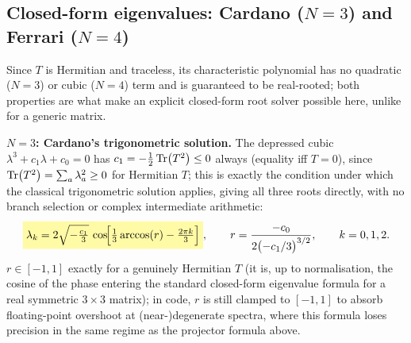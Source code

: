 \begin{theorybox}
\subsection*{Closed-form eigenvalues: Cardano ($N=3$) and Ferrari ($N=4$)}
Since $T$ is Hermitian and traceless, its characteristic polynomial has no
quadratic ($N=3$) or cubic ($N=4$) term and is guaranteed to be
real-rooted; both properties are what make an explicit closed-form root
solver possible here, unlike for a generic matrix.

\textbf{$N=3$: Cardano's trigonometric solution.} The depressed cubic
$\lambda^3+c_1\lambda+c_0=0$ has $c_1=-\tfrac12\Tr(T^2)\leq0$ always
(equality iff $T=0$), since $\Tr(T^2)=\sum_a\lambda_a^2\geq0$ for
Hermitian $T$; this is exactly the condition under which the classical
trigonometric solution applies, giving all three roots directly, with no
branch selection or complex intermediate arithmetic:
\begin{equation}
  \keyresult{\lambda_k = 2\sqrt{-\tfrac{c_1}{3}}\,
    \cos\!\Bigl[\tfrac13\arccos(r) - \tfrac{2\pi k}{3}\Bigr]},
  \qquad
  r = \frac{-c_0}{2\bigl(-c_1/3\bigr)^{3/2}}, \qquad k=0,1,2.
\end{equation}
$r\in[-1,1]$ exactly for a genuinely Hermitian $T$ (it is, up to
normalisation, the cosine of the phase entering the standard closed-form
eigenvalue formula for a real symmetric $3\times3$ matrix); in code, $r$ is
still clamped to $[-1,1]$ to absorb floating-point overshoot at
(near-)degenerate spectra, where this formula loses precision in the same
regime as the projector formula above.


\end{theorybox}
